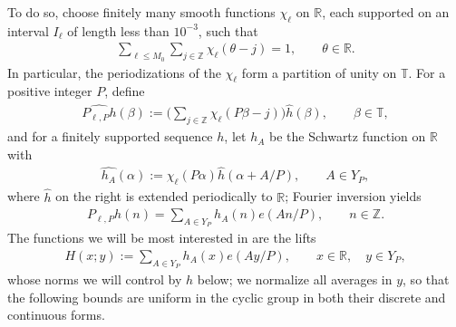 \documentclass[12pt,leqno]{amsart}
\numberwithin{equation}{section}
\theoremstyle{definition}
\theoremstyle{plain}
\begin{document}
	To do so, choose finitely many smooth functions $\chi_{\ell}$ on $\mathbb R$, each
	supported on an interval $I_\ell$ of length less than $10^{-3}$, such that
	\begin{align}
		\sum_{\ell\leq M_0}\sum_{j\in\mathbb Z}\chi_{\ell}(\theta-j)=1,
		\qquad \theta\in\mathbb R.
	\end{align}
	In particular, the periodizations of the $\chi_{\ell}$ form a partition of unity on
	$\mathbb T$. For a positive integer $P$, define
	\begin{align}
		\widehat{P_{\ell,P}h}(\beta)
		:=\Big(\sum_{j\in\mathbb Z}\chi_{\ell}(P\beta-j)\Big)
		\widehat h(\beta),\qquad \beta\in\mathbb T,
	\end{align}
	and for a finitely supported sequence $h$, let $h_A$ be the Schwartz function
	on $\mathbb R$ with
	\begin{align}\label{e:chart-def}
		\widehat{h_A}(\alpha)
		:=\chi_{\ell}(P\alpha)\widehat h(\alpha+A/P),
		\qquad A\in Y_P,
	\end{align}
	where $\widehat h$ on the right is extended periodically to $\mathbb R$;
	Fourier inversion yields
	\begin{align}
		P_{\ell,P}h(n)=\sum_{A\in Y_P}h_A(n)e(An/P),
		\qquad n\in\mathbb Z.
	\end{align}
	The functions we will be most interested in are the lifts
	\begin{align}
		H(x;y):=\sum_{A\in Y_P}h_A(x)e(Ay/P),
		\qquad x\in\mathbb R,\quad y\in Y_P,
	\end{align}
	whose norms we will control by $h$ below; we normalize all averages in $y$, so that the following bounds are
	uniform in the cyclic group in both their discrete and continuous forms.
	
\end{document}
